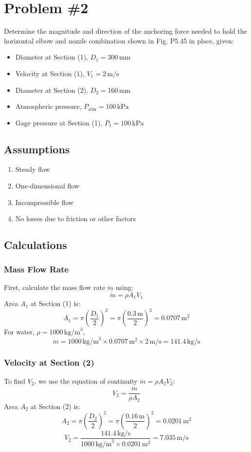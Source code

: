 \documentclass{article}
\begin{document}
\newpage
\section*{Problem \#2}
Determine the magnitude and direction of the anchoring force needed to hold the horizontal elbow and nozzle combination shown in Fig. P5.45 in place, given:
\begin{itemize}
    \item Diameter at Section (1), \(D_1 = 300 \, \text{mm}\)
    \item Velocity at Section (1), \(V_1 = 2 \, \text{m/s}\)
    \item Diameter at Section (2), \(D_2 = 160 \, \text{mm}\)
    \item Atmospheric pressure, \(P_{\text{atm}} = 100 \, \text{kPa}\)
    \item Gage pressure at Section (1), \(P_1 = 100 \, \text{kPa}\)
\end{itemize}

\subsection*{Assumptions}
\begin{enumerate}
    \item Steady flow
    \item One-dimensional flow
    \item Incompressible flow
    \item No losses due to friction or other factors
\end{enumerate}

\subsection*{Calculations}

\subsubsection*{Mass Flow Rate}
First, calculate the mass flow rate \(\dot{m}\) using:
\[
\dot{m} = \rho A_1 V_1
\]
Area \(A_1\) at Section (1) is:
\[
A_1 = \pi \left( \frac{D_1}{2} \right)^2 = \pi \left( \frac{0.3 \, \text{m}}{2} \right)^2 = 0.0707 \, \text{m}^2
\]
For water, \(\rho = 1000 \, \text{kg/m}^3\),
\[
\dot{m} = 1000 \, \text{kg/m}^3 \times 0.0707 \, \text{m}^2 \times 2 \, \text{m/s} = 141.4 \, \text{kg/s}
\]

\subsubsection*{Velocity at Section (2)}
To find \(V_2\), we use the equation of continuity \(\dot{m} = \rho A_2 V_2\):
\[
V_2 = \frac{\dot{m}}{\rho A_2}
\]
Area \(A_2\) at Section (2) is:
\[
A_2 = \pi \left( \frac{D_2}{2} \right)^2 = \pi \left( \frac{0.16 \, \text{m}}{2} \right)^2 = 0.0201 \, \text{m}^2
\]
\[
V_2 = \frac{141.4 \, \text{kg/s}}{1000 \, \text{kg/m}^3 \times 0.0201 \, \text{m}^2} = 7.035 \, \text{m/s}
\]
\end{document}
